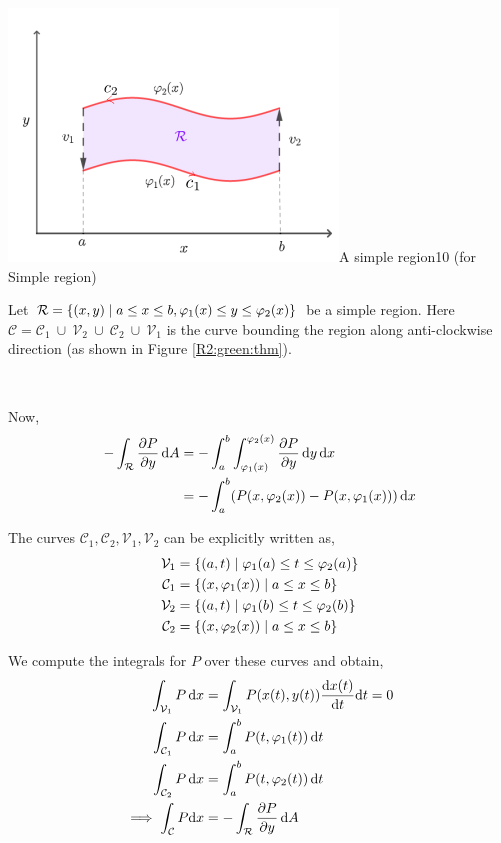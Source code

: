 \documentclass[../Analysis-3.tex]{subfiles}
\begin{document}
\begin{proofFig}{\includegraphics[width=.78\linewidth]{../figures/lec-28.1.png}}{A simple region}{\label{R2:green:thm}}{10} (for Simple region)

  Let $\mathcal{R} = \qty{(x,y) \mid a\leq x\leq b, \varphi_1(x) \leq y \leq \varphi_2(x)}$ be a simple region. Here $\mathcal{C} = \mathcal{C}_1 \ \cup \ \mathcal{V}_2 \ \cup \ \mathcal{C}_2 \ \cup \ \mathcal{V}_1$ is the curve bounding the region along anti-clockwise direction (as shown in Figure \ref{R2:green:thm}).

  \

  Now,
  \begin{align*}
    -\int_{\mathcal{R}} \pdv{P}{y} \, \dd A
     & = -\int_{a}^{b} \int_{\varphi_1(x)}^{\varphi_2(x)} \pdv{P}{y} \, \dd y \, \dd x \\
     & = - \int_{a}^{b} (P(x,\varphi_2(x))-P(x,\varphi_1(x))) \, \dd x                 \\
  \end{align*}

  The curves $\mathcal{C}_1,\mathcal{C}_2,\mathcal{V}_1,\mathcal{V}_2$ can be explicitly written as,
  \begin{align*}
    \mathcal{V}_1 & = \qty{(a,t) \mid \varphi_1(a) \leq t \leq \varphi_2(a)} \\
    \mathcal{C}_1 & = \qty{(x,\varphi_1(x)) \mid a \leq x \leq b}            \\
    \mathcal{V}_2 & = \qty{(a,t)\mid \varphi_1(b) \leq t \leq \varphi_2(b)}  \\
    \mathcal{C}_2 & = \qty{(x,\varphi_2(x)) \mid a \leq x \leq b}
  \end{align*}

  We compute the integrals for $ P $ over these curves and obtain,
  \begin{align*}
    \int_{\mathcal{V}_1} P \, \dd x    & = \int_{\mathcal{V}_1} P(x(t),y(t)) \dv{x(t)}{t} \dd t = 0 \\
    \int_{\mathcal{C}_1} P \, \dd x    & = \int_{a}^{b} P(t,\varphi_1(t)) \, \dd t                  \\
    \int_{\mathcal{C}_2} P \, \dd x    & = \int_{a}^{b} P(t,\varphi_2(t)) \, \dd t                  \\
    \implies \int_{\mathcal{C}} P\dd x & = -\int_{\mathcal{R}} \pdv{P}{y} \, \dd A
  \end{align*}


\end{proofFig}
\end{document}
